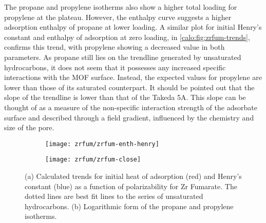The propane and propylene isotherms also show a higher total
loading for propylene at the plateau. However, the enthalpy
curve suggests a higher adsorption enthalpy of propane at lower
loading. A similar plot for initial Henry's constant and
enthalpy of adsorption at zero loading, in \autoref{calo:fig:zrfum-trends},
confirms this trend, with propylene showing a decreased value
in both parameters. As propane still lies on the trendline generated
by unsaturated hydrocarbons, it does not seem that it possesses any
increased specific interactions with the MOF surface. Instead, 
the expected values for propylene are lower than those of its
saturated counterpart. It should be pointed out that the
slope of the trendline is lower than that of the Takeda 5A. This slope 
can be thought of as a measure of the non-specific interaction strength
of the adsorbate surface and described through a field gradient,
influenced by the chemistry and size of the pore.

\begin{figure}[htb]
    \centering
    
    \begin{subfigure}[b]{0.5\textwidth}
        \centering
        \texttt{[image: zrfum/zrfum-enth-henry]}
        \caption{}%
        \label{calo:fig:zrfum-trends}
    \end{subfigure}%
    \begin{subfigure}[b]{0.45\textwidth}
        \centering
        \texttt{[image: zrfum/zrfum-close]}
        \caption{}%
        \label{calo:fig:zrfum-close}
    \end{subfigure}%
    \caption{(a) Calculated trends for initial heat of adsorption (red) and 
    Henry's constant (blue) as a function of polarizability for 
    Zr Fumarate. The dotted lines are best fit lines to 
    the series of unsaturated hydrocarbons. (b) Logarithmic form of the 
    propane and propylene isotherms.}%
    \label{calo:fig:zrfum-analysis}

\end{figure}

